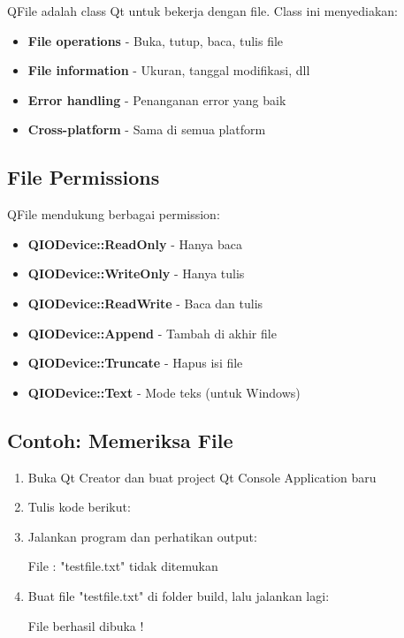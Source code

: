QFile adalah class Qt untuk bekerja dengan file. Class ini menyediakan:

\begin{itemize}
\item \textbf{File operations} - Buka, tutup, baca, tulis file
\item \textbf{File information} - Ukuran, tanggal modifikasi, dll
\item \textbf{Error handling} - Penanganan error yang baik
\item \textbf{Cross-platform} - Sama di semua platform
\end{itemize}

\subsection{File Permissions}

QFile mendukung berbagai permission:

\begin{itemize}
\item \textbf{QIODevice::ReadOnly} - Hanya baca
\item \textbf{QIODevice::WriteOnly} - Hanya tulis
\item \textbf{QIODevice::ReadWrite} - Baca dan tulis
\item \textbf{QIODevice::Append} - Tambah di akhir file
\item \textbf{QIODevice::Truncate} - Hapus isi file
\item \textbf{QIODevice::Text} - Mode teks (untuk Windows)
\end{itemize}

\subsection{Contoh: Memeriksa File}

\begin{enumerate}
\item Buka Qt Creator dan buat project Qt Console Application baru
\item Tulis kode berikut:



\item Jalankan program dan perhatikan output:

\begin{lcverbatim}
File : "testfile.txt" tidak ditemukan
\end{lcverbatim}

\item Buat file "testfile.txt" di folder build, lalu jalankan lagi:

\begin{lcverbatim}
File berhasil dibuka !
\end{lcverbatim}
\end{enumerate}

